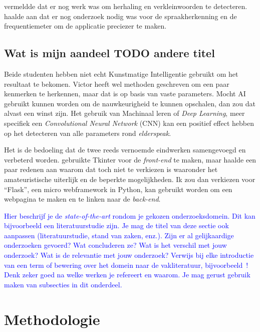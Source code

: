 \textcite{Beeckman2021} vermeldde dat er nog werk was om herhaling en verkleinwoorden te detecteren. \textcite{Standaert2021} haalde aan dat er nog onderzoek nodig was voor de spraakherkenning en de frequentiemeter om de applicatie preciezer te maken.

\subsection{Wat is mijn aandeel TODO andere titel}
\label{sec:watismijnadeel}

Beide studenten hebben niet echt Kunstmatige Intelligentie gebruikt om het resultaat te bekomen. Victor heeft wel methoden geschreven om een paar kenmerken te herkennen, maar dat is op basis van vaste parameters.
Mocht AI gebruikt kunnen worden om de nauwkeurigheid te kunnen opschalen, dan zou dat alvast een winst zijn. Het gebruik van Machinaal leren of \textit{Deep Learning}, meer specifiek een \textit{Convolutional Neural Network} (CNN) kan een positief effect hebben op het detecteren van alle parameters rond \textit{elderspeak}.

Het is de bedoeling dat de twee reeds vernoemde eindwerken samengevoegd en verbeterd worden. \textcite{Beeckman2021} gebruikte Tkinter voor de \textit{front-end} te maken, maar haalde een paar redenen aan waarom dat toch niet te verkiezen is waaronder het amateuristische uiterlijk en de beperkte mogelijkheden. Ik zou dan verkiezen voor ``Flask'', een micro webframework in Python, kan gebruikt worden om een webpagina te maken en te linken naar de \textit{back-end}.

\textcolor{blue}{
Hier beschrijf je de \emph{state-of-the-art} rondom je gekozen onderzoeksdomein. Dit kan bijvoorbeeld een literatuurstudie zijn. Je mag de titel van deze sectie ook aanpassen (literatuurstudie, stand van zaken, enz.). Zijn er al gelijkaardige onderzoeken gevoerd? Wat concluderen ze? Wat is het verschil met jouw onderzoek? Wat is de relevantie met jouw onderzoek?
Verwijs bij elke introductie van een term of bewering over het domein naar de vakliteratuur, bijvoorbeeld~\autocite{Doll1954}! Denk zeker goed na welke werken je refereert en waarom.
Je mag gerust gebruik maken van subsecties in dit onderdeel.}


\section{Methodologie}
\label{sec:methodologie}

